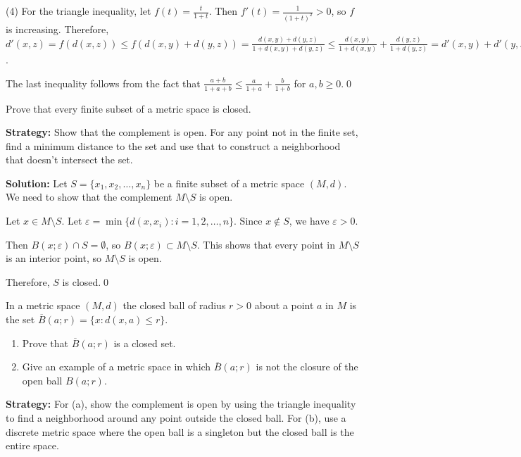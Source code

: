 (4) For the triangle inequality, let $f(t) = \frac{t}{1+t}$. Then $f'(t) = \frac{1}{(1+t)^2} > 0$, so $f$ is increasing. Therefore, $d'(x,z) = f(d(x,z)) \leq f(d(x,y) + d(y,z)) = \frac{d(x,y) + d(y,z)}{1 + d(x,y) + d(y,z)} \leq \frac{d(x,y)}{1 + d(x,y)} + \frac{d(y,z)}{1 + d(y,z)} = d'(x,y) + d'(y,z)$.

The last inequality follows from the fact that $\frac{a+b}{1+a+b} \leq \frac{a}{1+a} + \frac{b}{1+b}$ for $a,b \geq 0$.\qed


\begin{problembox}
Prove that every finite subset of a metric space is closed.
\end{problembox}

\noindent\textbf{Strategy:} Show that the complement is open. For any point not in the finite set, find a minimum distance to the set and use that to construct a neighborhood that doesn't intersect the set.

\bigskip\noindent\textbf{Solution:} Let $S = \{x_1, x_2, \ldots, x_n\}$ be a finite subset of a metric space $(M,d)$. We need to show that the complement $M \setminus S$ is open.

Let $x \in M \setminus S$. Let $\varepsilon = \min\{d(x,x_i) : i = 1,2,\ldots,n\}$. Since $x \notin S$, we have $\varepsilon > 0$.

Then $B(x;\varepsilon) \cap S = \emptyset$, so $B(x;\varepsilon) \subset M \setminus S$. This shows that every point in $M \setminus S$ is an interior point, so $M \setminus S$ is open.

Therefore, $S$ is closed.\qed


\begin{problembox}
In a metric space \((M, d)\) the closed ball of radius \( r > 0 \) about a point \( a \) in \( M \) is the set \( \overline{B}(a; r) = \{x : d(x, a) \leq r\} \).
\begin{enumerate}[label=\alph*)]
\item Prove that \( \overline{B}(a; r) \) is a closed set.
\item Give an example of a metric space in which \( \overline{B}(a; r) \) is not the closure of the open ball \( B(a; r) \).
\end{enumerate}
\end{problembox}

\noindent\textbf{Strategy:} For (a), show the complement is open by using the triangle inequality to find a neighborhood around any point outside the closed ball. For (b), use a discrete metric space where the open ball is a singleton but the closed ball is the entire space.

